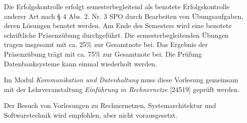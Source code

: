 \begin{course}

\setdoclanguagegerman
{}



\coursehead


\label{cour_8649.dp_997}


\begin{styleenv}
\begin{assessment}
Die Erfolgskontrolle erfolgt semesterbegleitend als benotete Erfolgskontrolle anderer Art nach § 4 Abs. 2. Nr. 3 SPO durch Bearbeiten von Übungsaufgaben, deren Lösungen benotet werden. Am Ende des Semesters wird eine benotete schriftliche Präsenzübung durchgeführt.\newline
\newline
Die semesterbegleitenden Übungen tragen insgesamt mit ca. 25\% zur Gesamtnote bei. Das Ergebnis der Präsenzübung trägt mit ca. 75\% zur Gesamtnote bei.\newline
\newline
Die Prüfung Datenbanksysteme kann einmal wiederholt werden.


\end{assessment}

\begin{conditions}Im Modul \emph{Kommunikation und Datenhaltung} muss diese Vorlesung gemeinsam mit der Lehrveranstaltung \emph{Einführung in Rechnernetze} [24519] geprüft werden.

\end{conditions}

\begin{recommendations}Der Besuch von Vorlesungen zu Rechnernetzen, Systemarchitektur und Softwaretechnik wird empfohlen, aber nicht vorausgesetzt.

\end{recommendations}
\end{styleenv}


\end{course}
